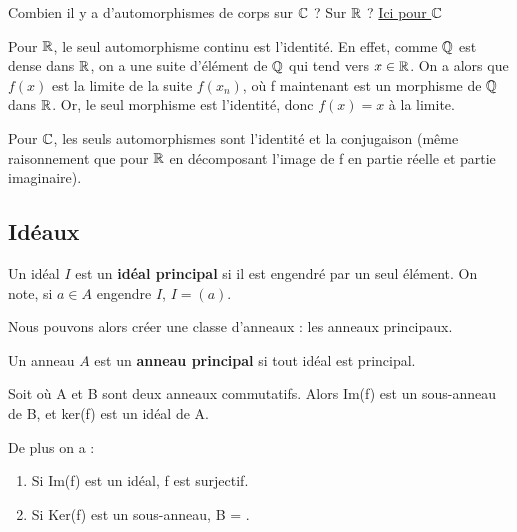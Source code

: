 \begin{question}
	Combien il y a d'automorphismes de corps sur $\mathbb{C}$ ? Sur $\mathbb{R}$ ?
	\href{http://www.math.uga.edu/~pete/Kestelman51.pdf}{Ici pour $\mathbb{C}$}

	Pour $\mathbb{R}$, le seul automorphisme continu est l'identité. En effet, comme
	$\mathbb{Q}$ est dense dans $\mathbb{R}$, on a une suite d'élément de $\mathbb{Q}$
	qui tend vers $x \in \mathbb{R}$. On a alors que $f(x)$ est la limite de la suite
	$f(x_{n})$, où f maintenant est un morphisme de $\mathbb{Q}$ dans $\mathbb{R}$.
	Or, le seul morphisme est l'identité, donc $f(x) = x$ à la limite.

	Pour $\mathbb{C}$, les seuls automorphismes sont l'identité et la conjugaison
	(même raisonnement que pour $\mathbb{R}$ en décomposant l'image de f en partie
	réelle et partie imaginaire).
\end{question}

\subsection{Idéaux}

\begin{definition} [Idéal]
	
	\label{ideal}
\end{definition}

\begin{definition} 
	Un idéal $I$ est un \textbf{idéal principal} si il est engendré par un seul
	élément. On note, si $a \in A$ engendre $I$, $I = (a)$.
	\label{principal_ideal}
\end{definition}

Nous pouvons alors créer une classe d'anneaux : les anneaux principaux.

\begin{definition} 
	Un anneau $A$ est un \textbf{anneau principal} si tout idéal est principal.
	\label{principal_ring}
\end{definition}

\begin{exemple}
	
\end{exemple}

\begin{proposition}
	Soit  où A et B sont deux anneaux commutatifs. Alors
	Im(f) est un sous-anneau de B, et ker(f) est un idéal de A.

	De plus on a :
	\begin{enumerate}
		\item Si Im(f) est un idéal, f est surjectif.
		\item Si Ker(f) est un sous-anneau, B = .
	\end{enumerate}
\end{proposition}

